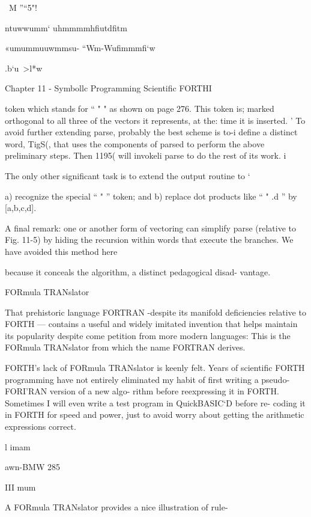 \ M ”“5"!

 

 

 

 

ntuwwumm‘
uhmmmmhﬁutdﬁtm

«umummuuwmmsu-
“Wm-Wuﬁmmmﬁ‘w

.b‘u~>l*w

Chapter 11 - Symbollc Programming Scientiﬁc FORTHI

token which stands for “ " " as shown on page 276. This token is;
marked orthogonal to all three of the vectors it represents, at the:
time it is inserted. '
To avoid further extending parse, probably the best scheme is to-i
define a distinct word, TigS(, that uses the components of parsed
to perform the above preliminary steps. Then 1195( will invokeli
parse to do the rest of its work. i

The only other signiﬁcant task is to extend the output routine to ‘

a) recognize the special “ " ” token; and
b) replace dot products like “ " .d ” by [a,b,c,d].

A ﬁnal remark: one or another form of vectoring can simplify
parse (relative to Fig. 11-5) by hiding the recursion within words
that execute the branches. We have avoided this method here

because it conceals the algorithm, a distinct pedagogical disad-
vantage.

FORmula TRANslator

That prehistoric language FORTRAN -despite its manifold
deﬁciencies relative to FORTH — contains a useful and widely
imitated invention that helps maintain its popularity despite come
petition from more modern languages: This is the FORmula
TRANslator from which the name FORTRAN derives.

FORTH’s lack of FORmula TRANslator is keenly felt. Years of
scientiﬁc FORTH programming have not entirely eliminated my
habit of ﬁrst writing a pseudo-FORI'RAN version of a new algo-
rithm before reexpressing it in FORTH. Sometimes I will even
write a test program in QuickBASIC‘D before re- coding it in
FORTH for speed and power, just to avoid worry about getting
the arithmetic expressions correct.

l
imam

awn-BMW 285

III mum

A FORmula TRANslator provides a nice illustration of rule-

